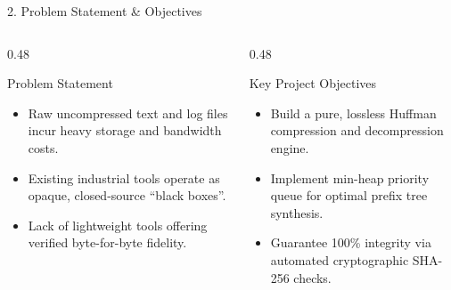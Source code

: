 \documentclass[aspectratio=169,11pt]{beamer}
\begin{document}
\begin{frame}{2. Problem Statement \& Objectives}
    \begin{columns}[T]
        \begin{column}{0.48\textwidth}
            \begin{block}{Problem Statement}
                \begin{itemize}
                    \item Raw uncompressed text and log files incur heavy storage and bandwidth costs.
                    \item Existing industrial tools operate as opaque, closed-source ``black boxes''.
                    \item Lack of lightweight tools offering verified byte-for-byte fidelity.
                \end{itemize}
            \end{block}
        \end{column}
        
        \begin{column}{0.48\textwidth}
            \begin{block}{Key Project Objectives}
                \begin{itemize}
                    \item Build a pure, lossless Huffman compression and decompression engine.
                    \item Implement min-heap priority queue for optimal prefix tree synthesis.
                    \item Guarantee 100\% integrity via automated cryptographic SHA-256 checks.
                \end{itemize}
            \end{block}
        \end{column}
    \end{columns}
\end{frame}
\end{document}
